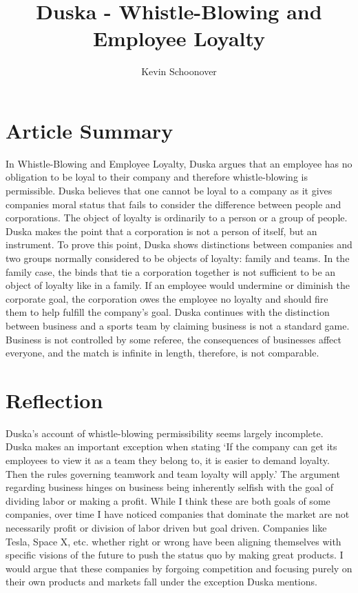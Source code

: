\documentclass[12pt]{article}
\begin{document}
\title{Duska - Whistle-Blowing and Employee Loyalty}
\author{Kevin Schoonover}

\maketitle

\section{Article Summary}
In Whistle-Blowing and Employee Loyalty, Duska argues that an employee has no
obligation to be loyal to their company and therefore whistle-blowing is
permissible. Duska believes that one cannot be loyal to a company as it gives
companies moral status that fails to consider the difference between people and
corporations. The object of loyalty is ordinarily to a person or a group of
people. Duska makes the point that a corporation is not a person of itself, but
an instrument. To prove this point, Duska shows distinctions between companies
and two groups normally considered to be objects of loyalty: family and teams.
In the family case, the binds that tie a corporation together is not sufficient
to be an object of loyalty like in a family. If an employee would undermine or
diminish the corporate goal, the corporation owes the employee no loyalty and
should fire them to help fulfill the company's goal.  Duska continues with the
distinction between business and a sports team by claiming business is not a
standard game.  Business is not controlled by some referee, the consequences of
businesses affect everyone, and the match is infinite in length, therefore, is
not comparable.

\section{Reflection}
Duska's account of whistle-blowing permissibility seems largely incomplete. Duska
makes an important exception when stating `If the company can get its employees
to view it as a team they belong to, it is easier to demand loyalty. Then the
rules governing teamwork and team loyalty will apply.' The argument regarding
business hinges on business being inherently selfish with the goal of dividing
labor or making a profit. While I think these are both goals of some companies,
over time I have noticed companies that dominate the market are not necessarily
profit or division of labor driven but goal driven. Companies like Tesla, Space
X, etc. whether right or wrong have been aligning themselves with specific
visions of the future to push the status quo by making great products. I would
argue that these companies by forgoing competition and focusing purely on their
own products and markets fall under the exception Duska mentions.
\end{document}
